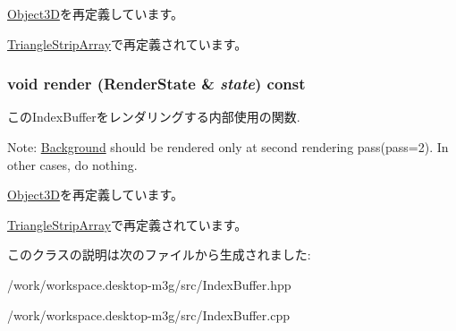 \hyperlink{classm3g_1_1Object3D_6fea17fa1532df3794f8cb39cb4f911f}{Object3D}を再定義しています。

\hyperlink{classm3g_1_1TriangleStripArray_6fea17fa1532df3794f8cb39cb4f911f}{TriangleStripArray}で再定義されています。\hypertarget{classm3g_1_1IndexBuffer_8babc8a79b78615da51161e94029eea9}{
\subsubsection[{render}]{\setlength{\rightskip}{0pt plus 5cm}void render ({\bf RenderState} \& {\em state}) const}}
\label{classm3g_1_1IndexBuffer_8babc8a79b78615da51161e94029eea9}


このIndexBufferをレンダリングする内部使用の関数.

Note: \hyperlink{classm3g_1_1Background}{Background} should be rendered only at second rendering pass(pass=2). In other cases, do nothing. 

\hyperlink{classm3g_1_1Object3D_8babc8a79b78615da51161e94029eea9}{Object3D}を再定義しています。

\hyperlink{classm3g_1_1TriangleStripArray_8babc8a79b78615da51161e94029eea9}{TriangleStripArray}で再定義されています。

このクラスの説明は次のファイルから生成されました:\begin{CompactItemize}
\item 
/work/workspace.desktop-m3g/src/IndexBuffer.hpp\item 
/work/workspace.desktop-m3g/src/IndexBuffer.cpp\end{CompactItemize}
